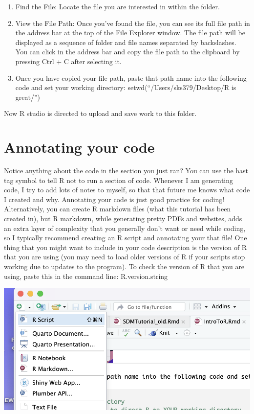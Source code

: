 \documentclass[
]{book}
\begin{document}
\begin{enumerate}
\def\labelenumi{\arabic{enumi}.}
\item
  Find the File: Locate the file you are interested in within the folder.
\item
  View the File Path: Once you've found the file, you can see its full file path in the address bar at the top of the File Explorer window. The file path will be displayed as a sequence of folder and file names separated by backslashes. You can click in the address bar and copy the file path to the clipboard by pressing Ctrl + C after selecting it.
\item
  Once you have copied your file path, paste that path name into the following code and set your working directory: setwd(``/Users/sks379/Desktop/R is great/'')
\end{enumerate}

Now R studio is directed to upload and save work to this folder.

\hypertarget{annotating-your-code}{%
\section{Annotating your code}\label{annotating-your-code}}

Notice anything about the code in the section you just ran? You can use the hast tag symbol to tell R not to run a section of code. Whenever I am generating code, I try to add lots of notes to myself, so that that future me knows what code I created and why. Annotating your code is just good practice for coding! Alternatively, you can create R markdown files (what this tutorial has been created in), but R markdown, while generating pretty PDFs and websites, adds an extra layer of complexity that you generally don't want or need while coding, so I typically recommend creating an R script and annotating your that file! One thing that you might want to include in your code description is the version of R that you are using (you may need to load older versions of R if your scripts stop working due to updates to the program). To check the version of R that you are using, paste this in the command line: R.version.string

\includegraphics{images/01-intro/createrscript.png}
\end{document}
